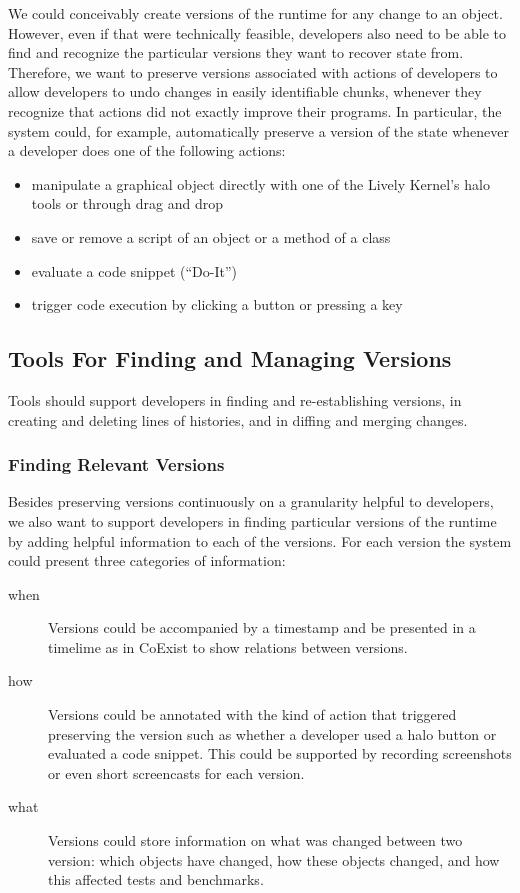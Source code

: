We could conceivably create versions of the runtime for any change to an object.
However, even if that were technically feasible, developers also need to be able to find and recognize the particular versions they want to recover state from.
Therefore, we want to preserve versions associated with actions of developers to allow developers to undo changes in easily identifiable chunks, whenever they recognize that actions did not exactly improve their programs.
In particular, the system could, for example, automatically preserve a version of the state whenever a developer does one of the following actions:
\begin{itemize}
    \item manipulate a graphical object directly with one of the Lively Kernel's halo tools or through drag and drop
    \item save or remove a script of an object or a method of a class
    \item evaluate a code snippet (``Do-It'')
    \item trigger code execution by clicking a button or pressing a key
\end{itemize}


\subsection{Tools For Finding and Managing Versions}

Tools should support developers in finding and re-establishing versions, in creating and deleting lines of histories, and in diffing and merging changes.

\subsubsection{Finding Relevant Versions}

Besides preserving versions continuously on a granularity helpful to developers, we also want to support developers in finding particular versions of the runtime by adding helpful information to each of the versions.
For each version the system could present three categories of information:

\begin{description}
    \item[when] Versions could be accompanied by a timestamp and be presented in a timelime as in CoExist to show relations between versions.
    \item[how] Versions could be annotated with the kind of action that triggered preserving the version such as whether a developer used a halo button or evaluated a code snippet. This could be supported by recording screenshots or even short screencasts for each version.
    \item[what] Versions could store information on what was changed between two version: which objects have changed, how these objects changed, and how this affected tests and benchmarks.
\end{description}

